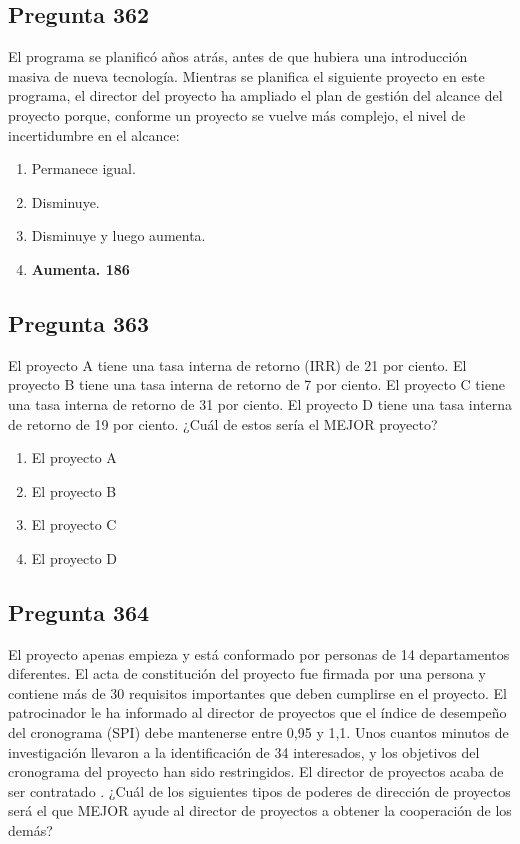 \documentclass[11pt,a4paper]{article}
\begin{document}
\subsection*{Pregunta 362}
El programa se planificó años atrás, antes de que hubiera una introducción masiva de nueva tecnología. Mientras se planifica el siguiente proyecto en este programa, el director del proyecto ha ampliado el plan de gestión del alcance del proyecto porque, conforme un proyecto se vuelve más complejo, el nivel de incertidumbre en el alcance:

\begin{enumerate}[label=\alph*)]
  \item Permanece igual.
  \item Disminuye.
  \item Disminuye y luego aumenta.
  \item \textbf{Aumenta. 186}
\end{enumerate}

\subsection*{Pregunta 363}
El proyecto A tiene una tasa interna de retorno (IRR) de 21 por ciento. El proyecto B tiene una tasa interna de retorno de 7 por ciento. El proyecto C tiene una tasa interna de retorno de 31 por ciento. El proyecto D tiene una tasa interna de retorno de 19 por ciento. ¿Cuál de estos sería el MEJOR proyecto?

\begin{enumerate}[label=\alph*)]
  \item El proyecto A
  \item El proyecto B
  \item El proyecto C
  \item El proyecto D
\end{enumerate}

\subsection*{Pregunta 364}
El proyecto apenas empieza y está conformado por personas de 14 departamentos diferentes. El acta de constitución del proyecto fue firmada por una persona y contiene más de 30 requisitos importantes que deben cumplirse en el proyecto. El patrocinador le ha informado al director de proyectos que el índice de desempeño del cronograma (SPI) debe mantenerse entre 0,95 y 1,1. Unos cuantos minutos de investigación llevaron a la identificación de 34 interesados, y los objetivos del cronograma del proyecto han sido restringidos. El director de proyectos acaba de ser contratado . ¿Cuál de los siguientes tipos de poderes de dirección de proyectos será el que MEJOR ayude al director de proyectos a obtener la cooperación de los demás?
\end{document}
